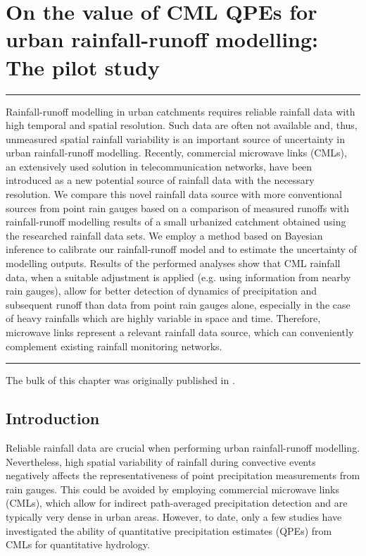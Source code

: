 \documentclass{ctuthesis}\usepackage[]{graphicx}\usepackage[]{color}
\begin{document}
        


\chapter{On the value of CML QPEs for urban rainfall-runoff modelling: The pilot study} \label{chap4}

\rule{\textwidth}{0.4pt}
Rainfall-runoff modelling in urban catchments requires reliable rainfall data with high temporal and spatial resolution. Such data are often not available and, thus, unmeasured spatial rainfall variability is an important source of uncertainty in urban rainfall-runoff modelling. Recently, commercial microwave links (CMLs), an extensively used solution in telecommunication networks, have been introduced as a new potential source of rainfall data with the necessary resolution. We compare this novel rainfall data source with more conventional sources from point rain gauges based on a comparison of measured runoffs with rainfall-runoff modelling results of a small urbanized catchment obtained using the researched rainfall data sets. We employ a method based on Bayesian inference to calibrate our rainfall-runoff model and to estimate the uncertainty of modelling outputs. Results of the performed analyses show that CML rainfall data, when a suitable adjustment is applied (e.g. using information from nearby rain gauges), allow for better detection of dynamics of precipitation and subsequent runoff than data from point rain gauges alone, especially in the case of heavy rainfalls which are highly variable in space and time. Therefore, microwave links represent a relevant rainfall data source, which can conveniently complement existing rainfall monitoring networks.
\rule[0.2cm]{\textwidth}{0.4pt}

{\footnotesize The bulk of this chapter was originally published in \cite{pastorekReliabilityMicrowaveLink2017, pastorekPosouzeniSrazkovychDat2018}.} 



\section{Introduction}

Reliable rainfall data are crucial when performing urban rainfall-runoff modelling. Nevertheless, high spatial variability of rainfall during convective events negatively affects the representativeness of point precipitation measurements from rain gauges. This could be avoided by employing commercial microwave links (CMLs), which allow for indirect path-averaged precipitation detection and are typically very dense in urban areas. However, to date, only a few studies have investigated the ability of quantitative precipitation estimates (QPEs) from CMLs for quantitative hydrology. 
\end{document}
